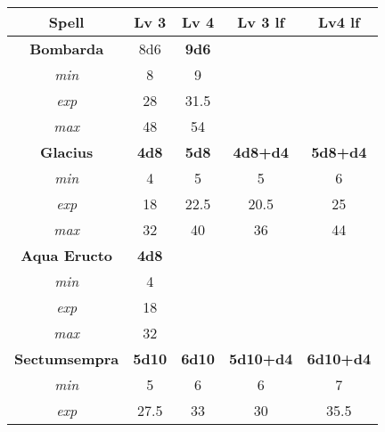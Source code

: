 \begin{tabular}{|c|cc|cc|}
	\textbf{Spell}         & \textbf{Lv 3}       & \textbf{Lv 4}         & \textbf{Lv 3 lf}  & \textbf{Lv4 lf}          \\ \hline
	\textbf{Bombarda}      &        8d6          & \textbf{9d6}          &                   &                          \\
	\textit{min}           &          8          &                 9     &                   &                          \\
	\textit{exp}           &         28          &                31.5   &                   &                          \\
	\textit{max}           &         48          &                54     &                   &                          \\ \hline
	\textbf{Glacius}       & \textbf{4d8}        & \textbf{5d8}          & \textbf{4d8+d4}   & \textbf{5d8+d4}          \\
	\textit{min}           &          4          &                 5     &           5       &                  6       \\
	\textit{exp}           &         18          &                22.5   &          20.5     &                 25       \\
	\textit{max}           &         32          &                40     &          36       &                 44       \\ \hline
	\textbf{Aqua Eructo}   & \textbf{4d8}        &                       &                   &                          \\
	\textit{min}           &          4          &                       &                   &                          \\
	\textit{exp}           &         18          &                       &                   &                          \\
	\textit{max}           &         32          &                       &                   &                          \\ \hline
	\textbf{Sectumsempra}  & \textbf{5d10}       & \textbf{6d10}         & \textbf{5d10+d4}  & \textbf{6d10+d4}         \\
	\textit{min}           &          5          &                 6     &            6      &                   7      \\
	\textit{exp}           &         27.5        &                33     &           30      &                  35.5    \\

\end{tabular}
